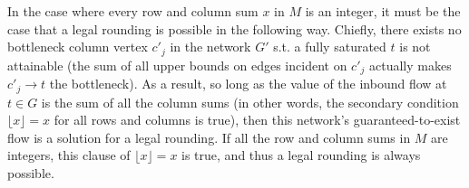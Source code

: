 \documentclass[11pt]{article}
\begin{document}
\begin{enumerate}[(a)]
\begin{solution}
        In the case where every row and column sum $x$ in $M$ is an integer, it must be the case that a legal rounding is possible in the following way. Chiefly, there exists no bottleneck column vertex ${c'}_j$ in the network $G'$ s.t. a fully saturated $t$ is not attainable (the sum of all upper bounds on edges incident on ${c'}_j$ actually makes ${c'}_j \to t$ the bottleneck). As a result, so long as the value of the inbound flow at $t \in G$ is the sum of all the column sums (in other words, the secondary condition $\lfloor x \rfloor = x$ for all rows and columns is true), then this network's guaranteed-to-exist flow is a solution for a legal rounding. If all the row and column sums in $M$ are integers, this clause of $\lfloor x \rfloor = x$ is true, and thus a legal rounding is always possible.
    \end{solution}
\end{enumerate}

\clearpage
\end{document}
